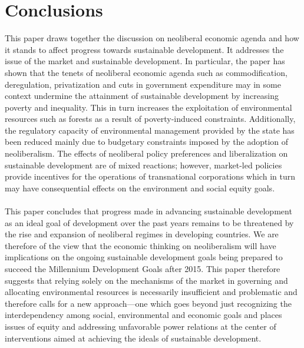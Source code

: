 \section*{Conclusions}
This paper draws together the discussion on neoliberal economic agenda and how it stands to affect progress towards sustainable development. It addresses the issue of the market and sustainable development. In particular, the paper has shown that the tenets of neoliberal economic agenda such as commodification, deregulation, privatization and cuts in government expenditure may in some context undermine the attainment of sustainable development by increasing poverty and inequality. This in turn increases the exploitation of environmental resources such as forests as a result of poverty-induced constraints. Additionally, the regulatory capacity of environmental management provided by the state has been reduced mainly due to budgetary constraints imposed by the adoption of neoliberalism. The effects of neoliberal policy preferences and liberalization on sustainable development are of mixed reactions; however, market-led policies provide incentives for the operations of transnational corporations which in turn may have consequential effects on the environment and social equity goals. \\
\\
This paper concludes that progress made in advancing sustainable development as an ideal goal of development over the past years remains to be threatened by the rise and expansion of neoliberal regimes in developing countries. We are therefore of the view that the economic thinking on neoliberalism will have implications on the ongoing sustainable development goals being prepared to succeed the Millennium Development Goals after 2015. This paper therefore suggests that relying solely on the mechanisms of the market in governing and allocating environmental resources is necessarily insufficient and problematic and therefore calls for a new approach—one which goes beyond just recognizing the interdependency among social, environmental and economic goals and places issues of equity and addressing unfavorable power relations at the center of interventions aimed at achieving the ideals of sustainable development. 
\clearpage